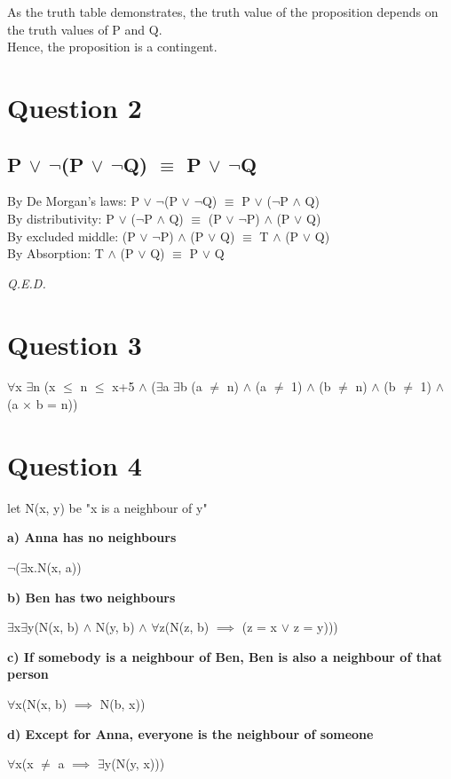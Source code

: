 \documentclass[a4paper]{article}
\begin{document}
As the truth table demonstrates, the truth value of the proposition depends on
the truth values of P and Q.\\
Hence, the proposition is a contingent.


\section*{Question 2}
\subsection*{P $\lor$ $\neg$(P $\lor$ $\neg$Q) $\equiv$ P $\lor$ $\neg$Q}
By De Morgan's laws: P $\lor$ $\neg$(P $\lor$ $\neg$Q) $\equiv$ P $\lor$ ($\neg$P $\land$ Q)\\
By distributivity:\;\;\;\;\;\;\; P $\lor$ ($\neg$P $\land$ Q) $\equiv$ (P $\lor$ $\neg$P) $\land$ (P $\lor$ Q)\\
By excluded middle:\;\; (P $\lor$ $\neg$P) $\land$ (P $\lor$ Q) $\equiv$ T $\land$ (P $\lor$ Q)\\
By Absorption:\;\;\;\;\;\;\;\;\;\; T $\land$ (P $\lor$ Q) $\equiv$ P $\lor$ Q

\vspace{10pt}

\emph{Q.E.D.}

\section*{Question 3}
$\forall$x $\exists$n (x $\le$ n $\leq$ x+5 $\land$
($\exists$a $\exists$b (a $\neq$ n) $\land$ (a $\neq$ 1) $\land$ (b $\neq$ n) $\land$ (b $\neq$ 1)
$\land$ (a $\times$ b = n))

\section*{Question 4}
\par\noindent\parskip 8pt
let N(x, y) be "x is a neighbour of y"

\par\noindent\parskip 2pt
\textbf{a) Anna has no neighbours}
\par\parskip 2pt
$\neg$($\exists$x.N(x, a))

\par\noindent\parskip 2pt
\textbf{b) Ben has two neighbours}
\par\parskip 2pt
$\exists$x$\exists$y(N(x, b) $\land$ N(y, b) $\land$
$\forall$z(N(z, b) $\implies$ (z = x $\lor$ z = y)))

\par\noindent\parskip 2pt
\textbf{c) If somebody is a neighbour of Ben, Ben is also a neighbour of that person}
\par\parskip 2pt
$\forall$x(N(x, b) $\implies$ N(b, x))

\par\noindent\parskip 2pt
\textbf{d) Except for Anna, everyone is the neighbour of someone}
\par\parskip 2pt
$\forall$x(x $\neq$ a $\implies$ $\exists$y(N(y, x)))
\end{document}
